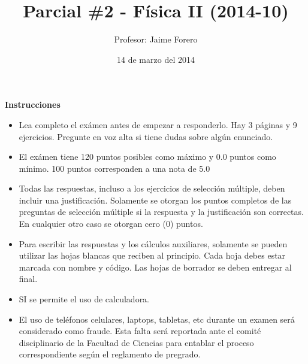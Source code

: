 \documentclass{article}
\title{Parcial \#2  - Física II (2014-10)\\ }
\author{Profesor: Jaime Forero}
\date{14 de marzo del 2014}
\begin{document}
\maketitle


{\bf Instrucciones}\\
\begin{itemize}
\item
Lea completo el ex\'amen antes de empezar a responderlo. Hay 3 p\'aginas y 9 ejercicios. Pregunte en voz alta si tiene dudas sobre alg\'un enunciado.
\item
El ex\'amen tiene 120 puntos posibles  como m\'aximo y 0.0 puntos como m\'inimo. 100 puntos corresponden a una nota de 5.0
\item 
Todas las respuestas, incluso a los ejercicios de selecci\'on m\'ultiple, deben incluir una justificaci\'on. Solamente se otorgan los puntos completos de las preguntas de selecci\'on m\'ultiple si la respuesta y la justificaci\'on son correctas. En cualquier otro caso se otorgan cero (0) puntos.
\item
Para escribir las respuestas y  los c\'alculos auxiliares, solamente se pueden utilizar las hojas blancas que reciben al principio. Cada hoja debes estar marcada con nombre y c\'odigo. Las hojas de borrador se deben entregar al final.
\item SI se permite el uso de calculadora.
\item
El uso de tel\'efonos celulares, laptops, tabletas, etc durante un examen ser\'a considerado como fraude. Esta falta ser\'a reportada ante el comit\'e disciplinario de la Facultad de Ciencias para entablar el proceso correspondiente seg\'un el reglamento de pregrado. 
\end{itemize}






\end{document}
